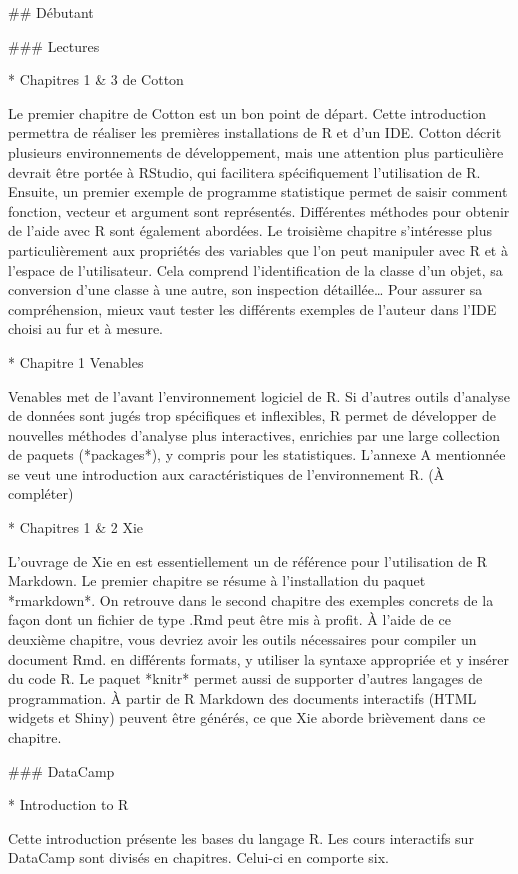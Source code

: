 \documentclass[
  letterpaper,
]{scrbook}
\begin{document}
\#\# Débutant

\#\#\# Lectures

* Chapitres 1 \& 3 de Cotton

Le premier chapitre de Cotton est un bon point de départ. Cette
introduction permettra de réaliser les premières installations de R et
d'un IDE. Cotton décrit plusieurs environnements de développement, mais
une attention plus particulière devrait être portée à RStudio, qui
facilitera spécifiquement l'utilisation de R. Ensuite, un premier
exemple de programme statistique permet de saisir comment fonction,
vecteur et argument sont représentés. Différentes méthodes pour obtenir
de l'aide avec R sont également abordées. Le troisième chapitre
s'intéresse plus particulièrement aux propriétés des variables que l'on
peut manipuler avec R et à l'espace de l'utilisateur. Cela comprend
l'identification de la classe d'un objet, sa conversion d'une classe à
une autre, son inspection détaillée\ldots{} Pour assurer sa
compréhension, mieux vaut tester les différents exemples de l'auteur
dans l'IDE choisi au fur et à mesure.

* Chapitre 1 Venables

Venables met de l'avant l'environnement logiciel de R. Si d'autres
outils d'analyse de données sont jugés trop spécifiques et inflexibles,
R permet de développer de nouvelles méthodes d'analyse plus
interactives, enrichies par une large collection de paquets
(*packages*), y compris pour les statistiques. L'annexe A mentionnée se
veut une introduction aux caractéristiques de l'environnement R. (À
compléter)

* Chapitres 1 \& 2 Xie

L'ouvrage de Xie en est essentiellement un de référence pour
l'utilisation de R Markdown. Le premier chapitre se résume à
l'installation du paquet *rmarkdown*. On retrouve dans le second
chapitre des exemples concrets de la façon dont un fichier de type .Rmd
peut être mis à profit. À l'aide de ce deuxième chapitre, vous devriez
avoir les outils nécessaires pour compiler un document Rmd. en
différents formats, y utiliser la syntaxe appropriée et y insérer du
code R. Le paquet *knitr* permet aussi de supporter d'autres langages de
programmation. À partir de R Markdown des documents interactifs (HTML
widgets et Shiny) peuvent être générés, ce que Xie aborde brièvement
dans ce chapitre.

\#\#\# DataCamp

* Introduction to R

Cette introduction présente les bases du langage R. Les cours
interactifs sur DataCamp sont divisés en chapitres. Celui-ci en comporte
six.
\end{document}
